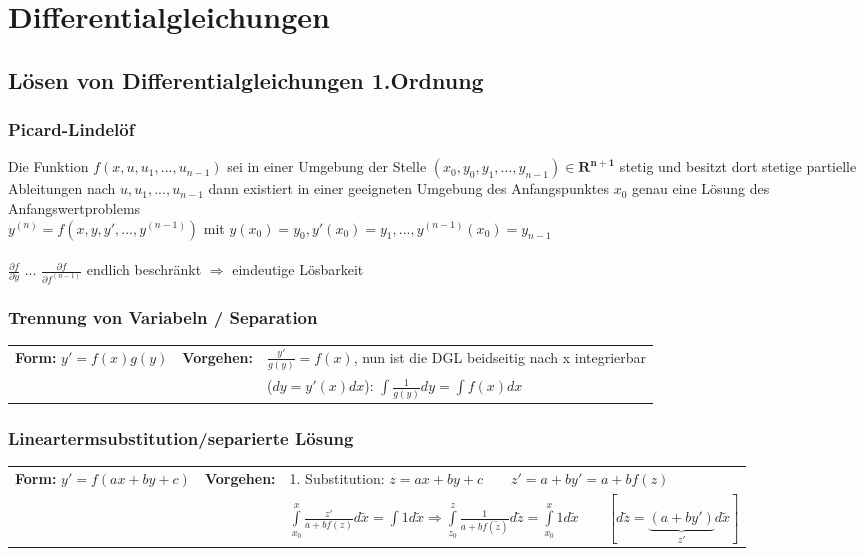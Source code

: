 \section{Differentialgleichungen}

\subsection{Lösen von Differentialgleichungen 1.Ordnung}

\subsubsection{Picard-Lindelöf}
Die Funktion $f(x, u, u_1, ..., u_{n-1})$ sei in einer Umgebung der Stelle $(x_0, y_0, y_1, ..., y_{n-1}) \in \mathbf{R^{n+1}}$ stetig und besitzt dort stetige partielle Ableitungen
nach $u, u_1, ..., u_{n-1}$ dann existiert in einer geeigneten Umgebung des Anfangspunktes $x_0$ genau eine Lösung des Anfangswertproblems\\
$y^{(n)} = f(x, y, y', ...,y^{(n-1)})$ mit $y(x_0) = y_0, y'(x_0) = y_1, ..., y^{(n-1)}(x_0) = y_{n-1}$ \\ \\
$\frac{\partial f}{\partial y}$ ... $\frac{\partial f}{\partial f^{(n-1)}}$ endlich beschränkt $\Rightarrow$ eindeutige Lösbarkeit


\subsubsection{Trennung von Variabeln / Separation }
\begin{tabular}{p{4cm}p{1.5cm}p{10.5cm}}
\textbf{Form:} $y' = f(x) g(y)$ &
\textbf{Vorgehen:}              &
$\frac{y'}{g(y)} = f(x)$, nun ist die DGL beidseitig nach x integrierbar\\  &&
($dy = y'(x) dx$): $\int \frac{1}{g(y)} dy = \int f(x) dx$ 
\end{tabular}

\subsubsection{Lineartermsubstitution/separierte Lösung}
\begin{tabular}{p{4cm}p{1.5cm}p{10.5cm}}
\textbf{Form:} $y'=f(ax+by+c)$   &
\textbf{Vorgehen:}               &
1. Substitution: $z=ax+by+c \qquad z'=a+by' =a+bf(z)$\\ &&
$\int\limits_{x_0}^{x}\frac{z'}{a+bf(z)}d\tilde{x} = \int 1 d\tilde{x} \Rightarrow \int\limits_{z_0}^{z}\frac{1}{a+bf(\tilde{z})}d\tilde{z} = \int\limits_{x_0}^{x}1 d\tilde{x} \qquad [d\tilde{z} = \underbrace{(a+by')}_{z'} d\tilde{x}]$
\end{tabular}

